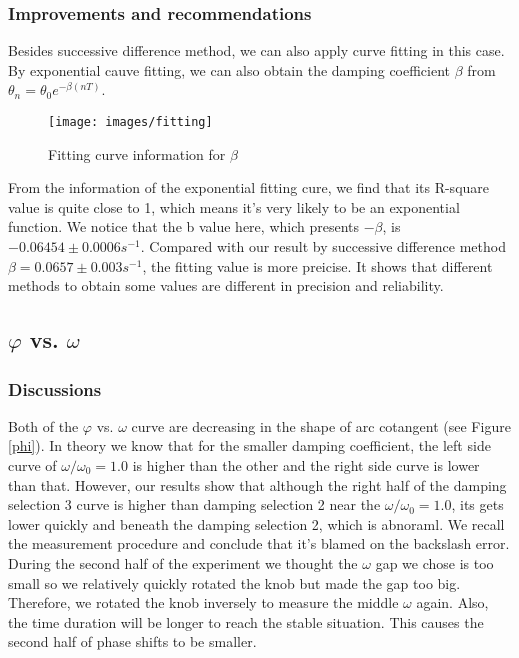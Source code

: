 \subsubsection{Improvements and recommendations}
    Besides successive difference method, we can also apply curve fitting in this case. By exponential cauve fitting, we can also obtain the damping coefficient $\beta$ from $\theta_n=\theta_0e^{-\beta (nT)}$.
    \begin{figure}[H]
    \centering
        \texttt{[image: images/fitting]}
        \caption{Fitting curve information for $\beta$}\label{fitting}
    \end{figure}
    From the information of the exponential fitting cure, we find that its R-square value is quite close to 1, which means it's very likely to be an exponential function. We notice that the b value here, which presents $-\beta$, is $-0.06454\pm 0.0006s^{-1}$. Compared with our result by successive difference method $\beta=0.0657\pm 0.003s^{-1}$, the fitting value is more preicise. It shows that different methods to obtain some values are different in precision and reliability.

\subsection{$\varphi$ vs. $\omega$}
\subsubsection{Discussions}
    Both of the $\varphi$ vs. $\omega$ curve are decreasing in the shape of arc cotangent (see Figure \ref{phi}). In theory we know that for the smaller damping coefficient, the left side curve of $\omega/\omega_0=1.0$ is higher than the other and the right side curve is lower than that. However, our results show that although the right half of the damping selection 3 curve is higher than damping selection 2 near the $\omega/\omega_0=1.0$, its gets lower quickly and beneath the damping selection 2, which is abnoraml. We recall the measurement procedure and conclude that it's blamed on the backslash error. During the second half of the experiment we thought the $\omega$ gap we chose is too small so we relatively quickly rotated the knob but made the gap too big. Therefore, we rotated the knob inversely to measure the middle $\omega$ again. Also, the time duration will be longer to reach the stable situation. This causes the second half of phase shifts to be smaller.

